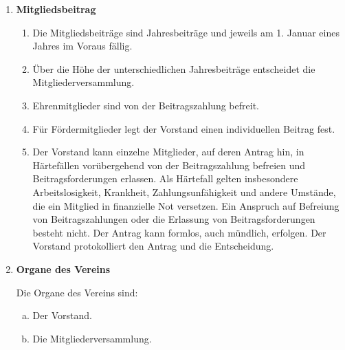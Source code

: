 \documentclass{article}
\begin{document}
\begin{enumerate}[§ 1.]
\item \textsf{\textbf{Mitgliedsbeitrag}}
	\begin{enumerate}[1.]
	\item Die Mitgliedsbeiträge sind Jahresbeiträge und jeweils am 1. Januar eines Jahres
im Voraus fällig.
	\item Über die Höhe der unterschiedlichen Jahresbeiträge entscheidet die
Mitgliederversammlung.
	\item Ehrenmitglieder sind von der Beitragszahlung befreit.
	\item Für Fördermitglieder legt der Vorstand einen individuellen Beitrag fest.
	\item Der Vorstand kann einzelne Mitglieder, auf deren Antrag hin, in Härtefällen vorübergehend von der Beitragszahlung befreien und Beitragsforderungen erlassen.
	Als Härtefall gelten insbesondere Arbeitslosigkeit, Krankheit, Zahlungsunfähigkeit und andere Umstände, die ein Mitglied in finanzielle Not versetzen.
	Ein Anspruch auf Befreiung von Beitragszahlungen oder die Erlassung von Beitragsforderungen besteht nicht.
	Der Antrag kann formlos, auch mündlich, erfolgen.
	Der Vorstand protokolliert den Antrag und die Entscheidung.
	\end{enumerate}
	
\item \textsf{\textbf{Organe des Vereins}}

Die Organe des Vereins sind:
	\begin{enumerate}[a.]
	\item Der Vorstand.
	\item Die Mitgliederversammlung.
	\end{enumerate}


\end{enumerate}
\end{document}
